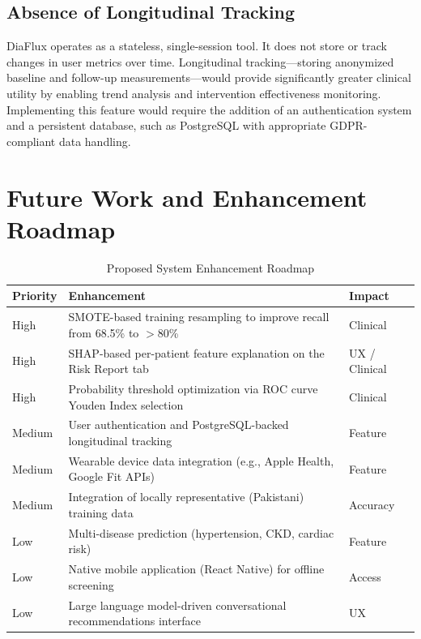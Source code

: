 \documentclass[12pt,a4paper]{report}
\begin{document}
\subsection{Absence of Longitudinal Tracking}
DiaFlux operates as a stateless, single-session tool. It does not store or track changes in user metrics over time. Longitudinal tracking---storing anonymized baseline and follow-up measurements---would provide significantly greater clinical utility by enabling trend analysis and intervention effectiveness monitoring. Implementing this feature would require the addition of an authentication system and a persistent database, such as PostgreSQL with appropriate GDPR-compliant data handling.

\section{Future Work and Enhancement Roadmap}

\begin{table}[H]
\centering
\caption{Proposed System Enhancement Roadmap}
\label{tab:future_work}
\begin{tabularx}{\textwidth}{lXl}
\toprule
\textbf{Priority} & \textbf{Enhancement} & \textbf{Impact} \\
\midrule
High   & SMOTE-based training resampling to improve recall from 68.5\% to $>$80\% & Clinical \\
High   & SHAP-based per-patient feature explanation on the Risk Report tab         & UX / Clinical \\
High   & Probability threshold optimization via ROC curve Youden Index selection    & Clinical \\
Medium & User authentication and PostgreSQL-backed longitudinal tracking            & Feature \\
Medium & Wearable device data integration (e.g., Apple Health, Google Fit APIs)    & Feature \\
Medium & Integration of locally representative (Pakistani) training data            & Accuracy \\
Low    & Multi-disease prediction (hypertension, CKD, cardiac risk)                & Feature \\
Low    & Native mobile application (React Native) for offline screening              & Access \\
Low    & Large language model-driven conversational recommendations interface        & UX \\
\bottomrule
\end{tabularx}
\end{table}
\end{document}
